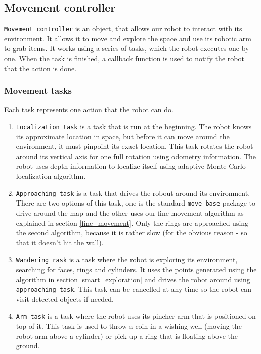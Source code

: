 \documentclass[12pt,a4paper]{article}
\begin{document}
	
	\subsection{Movement controller}
	\texttt{Movement controller} is an object, that allows our robot to interact with its environment. It allows it to move and explore the space and use its robotic arm to grab items. It works using a series of tasks, which the robot executes one by one. When the task is finished, a callback function is used to notify the robot that the action is done. \\

	\subsubsection{Movement tasks}
	Each task represents one action that the robot can do.

	\begin{enumerate}
		\item \texttt{Localization task} is a task that is run at the beginning. The robot knows its approximate location in space, but before it can move around the environment, it must pinpoint its exact location. This task rotates the robot around its vertical axis for one full rotation using odometry information. The robot uses depth information to localize itself using adaptive Monte Carlo localization algorithm.
		\item \texttt{Approaching task} is a task that drives the robout around its environment. There are two options of this task, one is the standard \texttt{move\_base} package to drive around the map and the other uses our fine movement algorithm as explained in section \ref{fine_movement}. Only the rings are approached using the second algorithm, because it is rather slow (for the obvious reason - so that it doesn't hit the wall).
		\item \texttt{Wandering rask} is a task where the robot is exploring its environment, searching for faces, rings and cylinders. It uses the points generated using the algorithm in section \ref{smart_exploration} and drives the robot around using \texttt{approaching task}. This task can be cancelled at any time so the robot can visit detected objects if needed.
		\item \texttt{Arm task} is a task where the robot uses its pincher arm that is positioned on top of it. This task is used to throw a coin in a wishing well (moving the robot arm above a cylinder) or pick up a ring that is floating above the ground.
	\end{enumerate}
\end{document}
